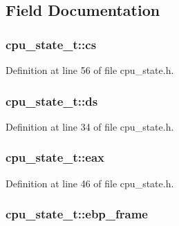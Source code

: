 \subsection{\-Field \-Documentation}
\hypertarget{structcpu__state__t_a510f889dbc7ef0f824f43208acdc0635}{
\subsubsection[{cs}]{ {\bf cpu\-\_\-state\-\_\-t\-::cs}}}\label{structcpu__state__t_a510f889dbc7ef0f824f43208acdc0635}


\-Definition at line 56 of file cpu\-\_\-state.\-h.

\hypertarget{structcpu__state__t_afb3e0ecb46bbcd9446b2d2b92af6908e}{
\subsubsection[{ds}]{ {\bf cpu\-\_\-state\-\_\-t\-::ds}}}\label{structcpu__state__t_afb3e0ecb46bbcd9446b2d2b92af6908e}


\-Definition at line 34 of file cpu\-\_\-state.\-h.

\hypertarget{structcpu__state__t_a8f3cd3b02991ffc7da27b369d3236abf}{
\subsubsection[{eax}]{ {\bf cpu\-\_\-state\-\_\-t\-::eax}}}\label{structcpu__state__t_a8f3cd3b02991ffc7da27b369d3236abf}


\-Definition at line 46 of file cpu\-\_\-state.\-h.

\hypertarget{structcpu__state__t_a69d91dda15fc92a6070329872fead2b1}{
\subsubsection[{ebp\-\_\-frame}]{ {\bf cpu\-\_\-state\-\_\-t\-::ebp\-\_\-frame}}}\label{structcpu__state__t_a69d91dda15fc92a6070329872fead2b1}



